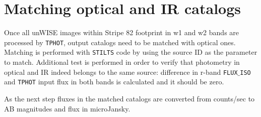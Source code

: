 \section{Matching optical and IR catalogs}

Once all unWISE images within Stripe 82 footprint in w1 and w2 bands are processed by {\tt TPHOT}, output catalogs need to be matched with optical ones. Matching is performed with {\tt STILTS} code by using the source ID as the parameter to match. Additional test is performed in order to verify that photometry in optical and IR indeed belongs to the same source: difference in r-band {\tt FLUX$\_$ISO} and {\tt TPHOT} input flux in both bands is calculated and it should be zero.

As the next step fluxes in the matched catalogs are converted from counts/sec to AB magnitudes and flux in microJansky.
